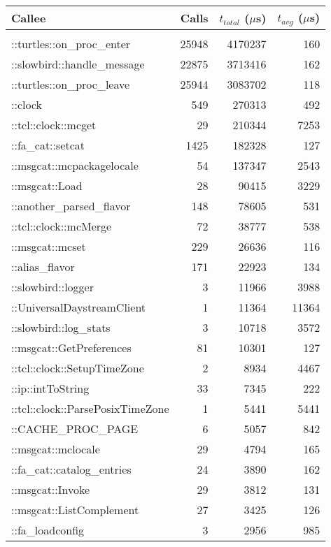 \documentclass{article}[letter,10pt]
\begin{document}
{{{        \begin{longtable}{l r r r}
          \toprule
          Callee & Calls & $t_{total}$ ($\mu$s) & $t_{avg}$ ($\mu$s) \\
          \midrule \\
          \endhead
          ::turtles::on\_proc\_enter & 25948 & 4170237 & 160 \\
          ::slowbird::handle\_message & 22875 & 3713416 & 162 \\
          ::turtles::on\_proc\_leave & 25944 & 3083702 & 118 \\
          ::clock & 549 & 270313 & 492 \\
          ::tcl::clock::mcget & 29 & 210344 & 7253 \\
          ::fa\_cat::setcat & 1425 & 182328 & 127 \\
          ::msgcat::mcpackagelocale & 54 & 137347 & 2543 \\
          ::msgcat::Load & 28 & 90415 & 3229 \\
          ::another\_parsed\_flavor & 148 & 78605 & 531 \\
          ::tcl::clock::mcMerge & 72 & 38777 & 538 \\
          ::msgcat::mcset & 229 & 26636 & 116 \\
          ::alias\_flavor & 171 & 22923 & 134 \\
          ::slowbird::logger & 3 & 11966 & 3988 \\
          ::UniversalDaystreamClient & 1 & 11364 & 11364 \\
          ::slowbird::log\_stats & 3 & 10718 & 3572 \\
          ::msgcat::GetPreferences & 81 & 10301 & 127 \\
          ::tcl::clock::SetupTimeZone & 2 & 8934 & 4467 \\
          ::ip::intToString & 33 & 7345 & 222 \\
          ::tcl::clock::ParsePosixTimeZone & 1 & 5441 & 5441 \\
          ::CACHE\_PROC\_PAGE & 6 & 5057 & 842 \\
          ::msgcat::mclocale & 29 & 4794 & 165 \\
          ::fa\_cat::catalog\_entries & 24 & 3890 & 162 \\
          ::msgcat::Invoke & 29 & 3812 & 131 \\
          ::msgcat::ListComplement & 27 & 3425 & 126 \\
          ::fa\_loadconfig & 3 & 2956 & 985 \\

\end{longtable}}}}
\end{document}
